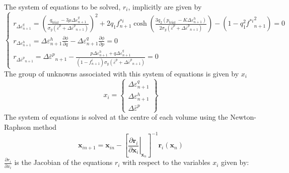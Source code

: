 \documentclass[sn-mathphys,Numbered,draft]{sn-jnl}%
\begin{document}
The system of equations to be solved, $r_i$, implicitly are given by
\begin{equation}
\label{eqn:discritesedGTNSystem}
\left\{\begin{array}{c}
r_{\Delta \varepsilon_{n+1}^q}=\left(\frac{q_{\text {trial }}-3 \mu \Delta \varepsilon_{n+1}^q}{\sigma_y\left(\bar{\varepsilon}^p+\Delta \bar{\varepsilon}^p{ }_{n+1}\right)}\right)^2+2 q_1 f^{*i}_{n+1} \cosh \left(\frac{3 q_2\left(p_{\text {trial }}-K \Delta \varepsilon_{n+1}^h\right)}{2 \sigma_y\left(\bar{\varepsilon}^p+\Delta \bar{\varepsilon}^p{ }_{n+1}\right)}\right)-\left(1-q_1^2 {f^{*i}}^2_{n+1}\right)=0 \\
r_{\Delta \varepsilon_{n+1}^h}=\Delta \varepsilon_{n+1}^h \frac{\partial \phi}{\partial q}-\Delta \varepsilon_{n+1}^q \frac{\partial \phi}{\partial p}=0 \\
r_{\Delta \bar{\varepsilon}^p{ }_{n+1}}=\Delta \bar{\varepsilon}^p{ }_{n+1}-\frac{p \Delta \varepsilon_{n+1}^h+q \Delta \varepsilon_{n+1}^q}{(1-f^i_{n+1}) \sigma_y\left(\bar{\varepsilon}^p+\Delta \bar{\varepsilon}^p{ }_{n+1}\right)}=0
\end{array}\right.
\end{equation}
The group of unknowns associated with this system of equations is given by $x_i$
\begin{equation}
x_i=\left\{\begin{array}{c}
\Delta \varepsilon_{n+1}^q \\
\Delta \varepsilon_{n+1}^h \\
\Delta \bar{\varepsilon}^p
\end{array}\right\}
\end{equation}
The system of equations is solved at the centre of each volume using the Newton-Raphson method
\begin{equation}
\boldsymbol{x}_{i n+1}=\boldsymbol{x}_{i n}-\left[\left.\frac{\partial \boldsymbol{r}_i}{\partial \boldsymbol{x}_i}\right|_{\boldsymbol{x}_n}\right]^{-1} \boldsymbol{r}_i\left(\boldsymbol{x}_n\right)
\end{equation}
$\frac{\partial r_i}{\partial x_i}$ is the Jacobian of the equations $r_i$ with respect to the variables $x_i$ given by:
\end{document}
